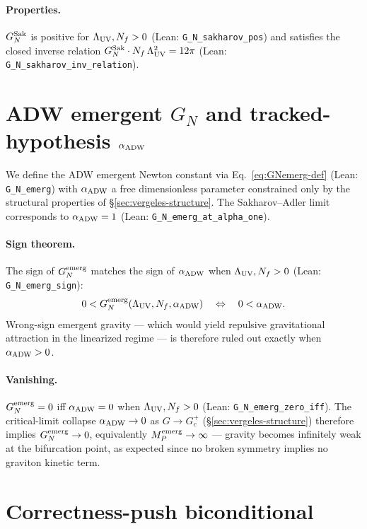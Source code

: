 \documentclass[aps,prd,twocolumn,showpacs,superscriptaddress,nofootinbib]{revtex4-2}
\newcommand{\GN}{G_{N}}
\newcommand{\GNemerg}{G_{N}^{\rm emerg}}
\newcommand{\GNsak}{G_{N}^{\rm Sak}}
\newcommand{\Lambdauv}{\Lambda_{\rm UV}}
\newcommand{\Mpl}{M_{P}}
\newcommand{\Nf}{N_{f}}
\newcommand{\aADW}{\alpha_{\rm ADW}}
\newcommand{\Gc}{G_{c}}
\begin{document}
\paragraph*{Properties.}
$\GNsak$ is positive for $\Lambdauv,\Nf > 0$ (Lean:
\texttt{G\_N\_sakharov\_pos}) and satisfies the closed inverse
relation $\GNsak \cdot \Nf\,\Lambdauv^{2} = 12\pi$ (Lean:
\texttt{G\_N\_sakharov\_inv\_relation}).

\section{ADW emergent $\GN$ and tracked-hypothesis $\aADW$}
\label{sec:adw-emerg}

We define the ADW emergent Newton constant via
Eq.~\eqref{eq:GNemerg-def} (Lean: \texttt{G\_N\_emerg}) with $\aADW$ a
free dimensionless parameter constrained only by the structural
properties of \S\ref{sec:vergeles-structure}. The Sakharov--Adler limit
corresponds to $\aADW = 1$ (Lean:
\texttt{G\_N\_emerg\_at\_alpha\_one}).

\paragraph*{Sign theorem.}
The sign of $\GNemerg$ matches the sign of $\aADW$ when
$\Lambdauv,\Nf > 0$ (Lean: \texttt{G\_N\_emerg\_sign}):
\begin{equation}
\label{eq:sign-thm}
0 < \GNemerg(\Lambdauv,\Nf,\aADW) \quad\Leftrightarrow\quad
   0 < \aADW.
\end{equation}
Wrong-sign emergent gravity --- which would yield repulsive
gravitational attraction in the linearized regime --- is therefore
ruled out exactly when $\aADW > 0$.

\paragraph*{Vanishing.}
$\GNemerg = 0$ iff $\aADW = 0$ when $\Lambdauv,\Nf > 0$ (Lean:
\texttt{G\_N\_emerg\_zero\_iff}). The critical-limit collapse
$\aADW \to 0$ as $G \to \Gc^{+}$ (\S\ref{sec:vergeles-structure})
therefore implies $\GNemerg \to 0$, equivalently
$\Mpl^{\rm emerg} \to \infty$ --- gravity becomes infinitely weak
at the bifurcation point, as expected since no broken symmetry
implies no graviton kinetic term.

\section{Correctness-push biconditional}
\label{sec:correctness-push}
\end{document}
